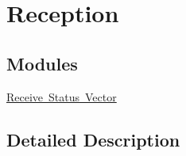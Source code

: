 \hypertarget{group__reception}{}\section{Reception}
\label{group__reception}
\subsection*{Modules}
\begin{DoxyCompactItemize}
\item 
\mbox{\hyperlink{group__rsv}{Receive Status Vector}}
\end{DoxyCompactItemize}


\subsection{Detailed Description}
